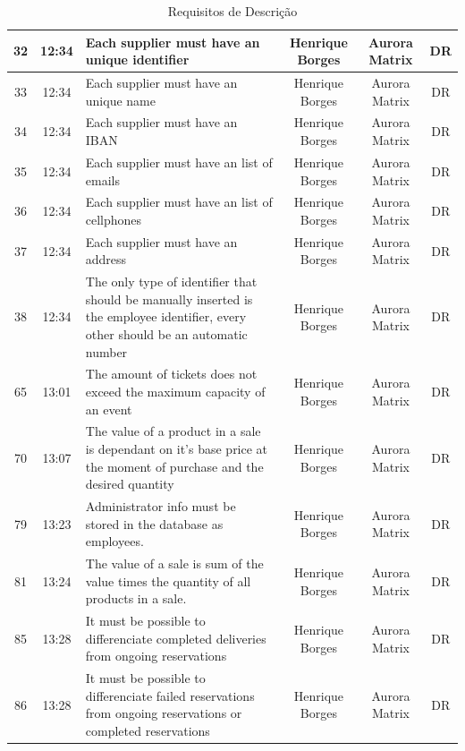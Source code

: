 \documentclass[a4paper,12pt]{scrreprt}
\begin{document}
\begin{table}[h]
{\begin{tabular}{ | c | c |p{15cm} | c | c | c |}
        32 & 12:34 & Each supplier must have an unique identifier & Henrique Borges & Aurora Matrix & DR \\ \hline
        33 & 12:34 & Each supplier must have an unique name & Henrique Borges & Aurora Matrix & DR \\ \hline
        34 & 12:34 & Each supplier must have an IBAN & Henrique Borges & Aurora Matrix & DR \\ \hline
        35 & 12:34 & Each supplier must have an list of emails & Henrique Borges & Aurora Matrix & DR \\ \hline
        36 & 12:34 & Each supplier must have an list of cellphones & Henrique Borges & Aurora Matrix & DR \\ \hline
        37 & 12:34 & Each supplier must have an address & Henrique Borges & Aurora Matrix & DR \\ \hline
        38 & 12:34 & The only type of identifier that should be manually inserted is the employee identifier, every other should be an automatic number & Henrique Borges & Aurora Matrix & DR \\ \hline
        65 & 13:01 & The amount of tickets does not exceed the maximum capacity of an event & Henrique Borges & Aurora Matrix & DR \\ \hline
        70 & 13:07 & The value of a product in a sale is dependant on it's base price at the moment of purchase and the desired quantity & Henrique Borges & Aurora Matrix & DR \\ \hline
        79 & 13:23 & Administrator info must be stored in the database as employees. & Henrique Borges & Aurora Matrix & DR \\ \hline
        81 & 13:24 & The value of a sale is sum of the value times the quantity of all products in a sale. & Henrique Borges & Aurora Matrix & DR \\ \hline
        85 & 13:28 & It must be possible to differenciate completed deliveries from ongoing reservations & Henrique Borges & Aurora Matrix & DR \\ \hline
        86 & 13:28 & It must be possible to differenciate failed reservations from ongoing reservations or completed reservations & Henrique Borges & Aurora Matrix & DR \\ \hline
    \end{tabular}%
    }
    \caption{Requisitos de Descrição}
    \end{table}
\newpage
\end{document}
